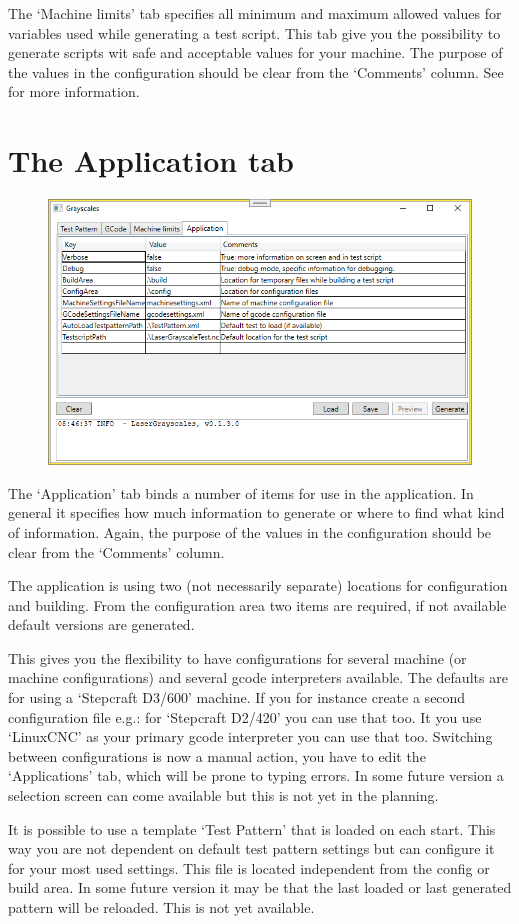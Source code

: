 The `Machine limits' tab specifies all minimum and maximum allowed values for variables used while generating a test script. This tab give you the possibility to generate
scripts wit safe and acceptable values for your machine. The purpose of the values in the configuration should be clear from the `Comments' column. See 
for more information.

\section{The Application tab}\label{ApplicationTab}
\begin{figure}[h!]
    \centering
    \includegraphics[width=0.8\linewidth]{./images/Application.png}
\end{figure}

The `Application' tab binds a number of items for use in the application. In general it specifies how much information to generate or where to find what kind of information.
Again, the purpose of the values in the configuration should be clear from the `Comments' column.

The application is using two (not necessarily separate) locations for configuration and building. From the configuration area two items are required, if not available
default versions are generated.

This gives you the flexibility to have configurations for several machine (or machine configurations) and several gcode interpreters available. The defaults are for
using a `Stepcraft D3/600' machine. If you for instance create a second configuration file e.g.: for `Stepcraft D2/420' you can use that too. It you use `LinuxCNC' as your
primary gcode interpreter you can use that too. Switching between configurations is now a manual action, you have to edit the `Applications' tab, which will be prone to
typing errors. In some future version a selection screen can come available but this is not yet in the planning.

It is possible to use a template `Test Pattern' that is loaded on each start. This way you are not dependent on default test pattern settings but can configure it for
your most used settings. This file is located independent from the config or build area. In some future version it may be that the last loaded or last generated pattern
will be reloaded. This is not yet available.

